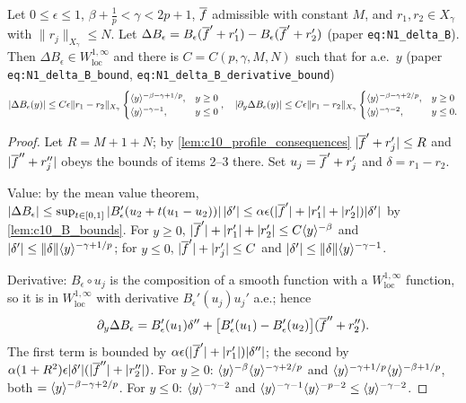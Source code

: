 \begin{lemma}
  \label{lem:c10_delta_B}
  Let $0\le\epsilon\le1$, $\beta+\frac1p<\gamma<2p+1$, $\overline{f}$ admissible with constant $M$, and
  $r_1,r_2\in X_\gamma$ with $\|r_j\|_{X_\gamma}\le N$. Let
  $\Delta B_\epsilon=B_\epsilon(\overline{f}'+r_1')-B_\epsilon(\overline{f}'+r_2')$ (paper \texttt{eq:N1\_delta\_B}). Then
  $\Delta B_\epsilon\in W^{1,\infty}_{\mathrm{loc}}$ and there is $C=C(p,\gamma,M,N)$ such that for a.e.\ $y$
  (paper \texttt{eq:N1\_delta\_B\_bound}, \texttt{eq:N1\_delta\_B\_derivative\_bound})
  \[
    |\Delta B_\epsilon(y)|\le C\epsilon\|r_1-r_2\|_{X_\gamma}\begin{cases}\langle y \rangle^{-\beta-\gamma+1/p},&y\ge0\\\langle y \rangle^{-\gamma-1},&y\le0\end{cases},
    \quad
    |\partial_y\Delta B_\epsilon(y)|\le C\epsilon\|r_1-r_2\|_{X_\gamma}\begin{cases}\langle y \rangle^{-\beta-\gamma+2/p},&y\ge0\\\langle y \rangle^{-\gamma-2},&y\le0.\end{cases}
  \]
\end{lemma}
\begin{proof}
  Let $R=M+1+N$; by \cref{lem:c10_profile_consequences} $|\overline{f}'+r_j'|\le R$ and $|\overline{f}''+r_j''|$ obeys
  the bounds of items 2--3 there. Set $u_j=\overline{f}'+r_j'$ and $\delta=r_1-r_2$.

  Value: by the mean value theorem, $|\Delta B_\epsilon|\le\sup_{t\in[0,1]}|B_\epsilon'(u_2+t(u_1-u_2))|\,|\delta'|
  \le\alpha\epsilon(|\overline{f}'|+|r_1'|+|r_2'|)|\delta'|$ by \cref{lem:c10_B_bounds}. For $y\ge0$,
  $|\overline{f}'|+|r_1'|+|r_2'|\le C\langle y \rangle^{-\beta}$ and $|\delta'|\le\|\delta\|\langle y \rangle^{-\gamma+1/p}$;
  for $y\le0$, $|\overline{f}'|+|r_j'|\le C$ and $|\delta'|\le\|\delta\|\langle y \rangle^{-\gamma-1}$.

  Derivative: $B_\epsilon\circ u_j$ is the composition of a smooth function with a $W^{1,\infty}_{\mathrm{loc}}$
  function, so it is in $W^{1,\infty}_{\mathrm{loc}}$ with derivative $B_\epsilon'(u_j)u_j'$ a.e.; hence
  \[
    \partial_y\Delta B_\epsilon=B_\epsilon'(u_1)\delta''+\bigl[B_\epsilon'(u_1)-B_\epsilon'(u_2)\bigr](\overline{f}''+r_2'').
  \]
  The first term is bounded by $\alpha\epsilon(|\overline{f}'|+|r_1'|)|\delta''|$; the second by
  $\alpha(1+R^2)\epsilon|\delta'|(|\overline{f}''|+|r_2''|)$. For $y\ge0$:
  $\langle y \rangle^{-\beta}\langle y \rangle^{-\gamma+2/p}$ and $\langle y \rangle^{-\gamma+1/p}\langle y \rangle^{-\beta+1/p}$, both
  $=\langle y \rangle^{-\beta-\gamma+2/p}$. For $y\le0$: $\langle y \rangle^{-\gamma-2}$ and
  $\langle y \rangle^{-\gamma-1}\langle y \rangle^{-p-2}\le\langle y \rangle^{-\gamma-2}$.
\end{proof}


